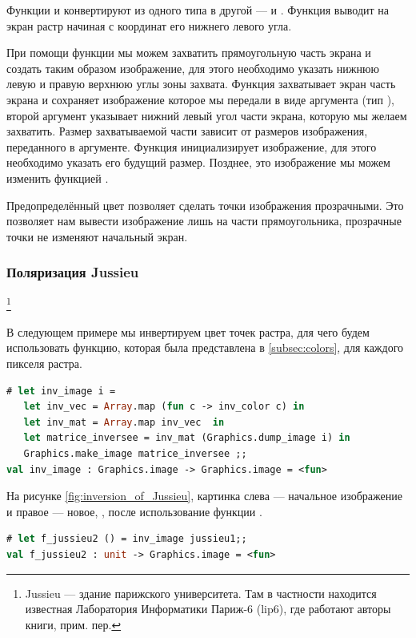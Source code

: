 Функции  и  конвертируют из одного типа в 
другой ---  и . Функция  
выводит на экран растр начиная с координат его нижнего левого угла.

При помощи функции  мы можем захватить прямоугольную часть 
экрана и создать таким образом изображение, для этого необходимо указать нижнюю 
левую и правую верхнюю углы зоны захвата. Функция  
захватывает экран часть экрана и сохраняет изображение которое мы передали в 
виде аргумента (тип ), второй аргумент указывает нижний левый угол 
части экрана, которую мы желаем захватить. Размер захватываемой части зависит 
от размеров изображения, переданного в аргументе. Функция  
инициализирует изображение, для этого необходимо указать его будущий размер. 
Позднее, это изображение мы можем изменить функцией .

Предопределённый цвет  позволяет сделать точки изображения 
прозрачными. Это позволяет нам вывести изображение лишь на части прямоугольника, 
прозрачные точки не изменяют начальный экран.

\subsubsection{Поляризация Jussieu}\footnote{Jussieu --- здание парижского 
университета. Там в частности находится известная Лаборатория Информатики 
Париж-6 (lip6), где работают авторы книги, прим. пер.}

В следующем примере мы инвертируем цвет точек растра, для чего будем 
использовать функцию, которая была представлена в \ref{subsec:colors}, для 
каждого пикселя растра.

\begin{lstlisting}[language=OCaml]
# let inv_image i = 
   let inv_vec = Array.map (fun c -> inv_color c) in
   let inv_mat = Array.map inv_vec  in 
   let matrice_inversee = inv_mat (Graphics.dump_image i) in 
   Graphics.make_image matrice_inversee ;;
val inv_image : Graphics.image -> Graphics.image = <fun>
\end{lstlisting}

На рисунке \ref{fig:inversion_of_Jussieu}, картинка слева --- начальное 
изображение и правое --- новое, , после использование 
функции .

\begin{lstlisting}[language=OCaml]
# let f_jussieu2 () = inv_image jussieu1;; 
val f_jussieu2 : unit -> Graphics.image = <fun>
\end{lstlisting}

